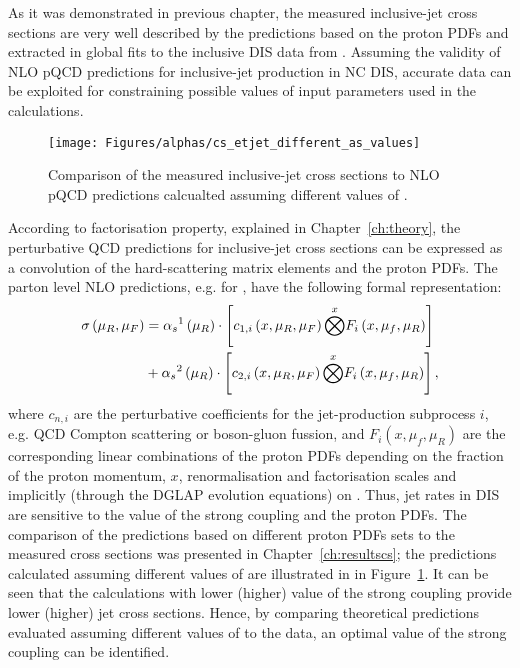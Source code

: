 As it was demonstrated in previous chapter, the measured inclusive-jet cross sections are very well described by the predictions based on the proton PDFs and \asz extracted in global fits to the inclusive DIS data from \hera. Assuming the validity of NLO pQCD predictions for inclusive-jet production in NC DIS, accurate data can be exploited for constraining possible values of input parameters used in the calculations.
\begin{figure}[t]
 \centering
 \texttt{[image: Figures/alphas/cs\_etjet\_different\_as\_values]}
 \caption{Comparison of the measured inclusive-jet cross sections to NLO pQCD predictions calcualted assuming different values of \asz.}
 \label{fig:etjetdifferentas}
\end{figure}

According to factorisation property, explained in Chapter~\ref{ch:theory}, the perturbative QCD predictions for inclusive-jet cross sections can be expressed as a convolution of the hard-scattering matrix elements and the proton PDFs. The parton level NLO predictions, e.g. for \dsdetjetb, have the following formal representation:
\begin{equation}
	\begin{split}
\sigma\left( \mu_R, \mu_F\right)  &= \mbox{$\alpha_{s}$}^1\left( \mu_R\right) \cdot \left[ c_{1,i}\left( x, \mu_R, \mu_F\right) \overset{x}{\bigotimes } F_i\left( x, \mu_f, \mu_R \right) \right] \\
&+ \mbox{$\alpha_{s}$}^2\left( \mu_R\right) \cdot \left[ c_{2,i}\left( x, \mu_R, \mu_F\right) \overset{x}{\bigotimes } F_i\left( x, \mu_f, \mu_R \right) \right],
	\end{split}
\end{equation}
where $c_{n,i}$ are the perturbative coefficients for the jet-production subprocess $i$, e.g. QCD Compton scattering or boson-gluon fussion, and $F_i\left( x, \mu_f, \mu_R \right)$ are the corresponding linear combinations of the proton PDFs depending on the fraction of the proton momentum, $x$, renormalisation and factorisation scales and implicitly (through the DGLAP evolution equations) on \as. Thus, jet rates in DIS are sensitive to the value of the strong coupling and the proton PDFs. The comparison of the predictions based on different proton PDFs sets to the measured cross sections was presented in Chapter~\ref{ch:resultscs}; the predictions calculated assuming different values of \asz are illustrated in in Figure~\ref{fig:etjetdifferentas}. It can be seen that the calculations with lower (higher) value of the strong coupling provide lower (higher) jet cross sections. Hence, by comparing theoretical predictions evaluated assuming different values of \asz to the data, an optimal value of the strong coupling can be identified.

